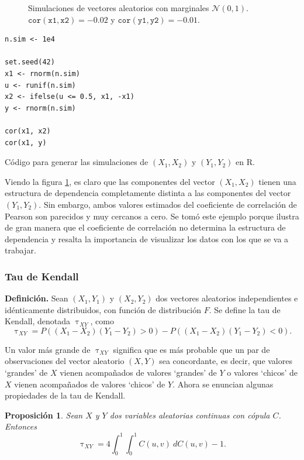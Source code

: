 \documentclass[11pt,a4paper]{article}
\newtheorem{proposition}{Proposición}[subsection]
\begin{document}
\begin{figure}[H]
    \caption{Simulaciones de vectores aleatorios con marginales $\mathcal{N}(0, 1)$. $\mathtt{cor(x1, x2)} = -0.02$ y $\mathtt{cor(y1, y2)} = -0.01$.}
    \label{fig:panel_corr}
\end{figure}

\begin{table}[htb]
\begin{lstlisting}
n.sim <- 1e4

set.seed(42)
x1 <- rnorm(n.sim)
u <- runif(n.sim)
x2 <- ifelse(u <= 0.5, x1, -x1)
y <- rnorm(n.sim)

cor(x1, x2)
cor(x1, y)
\end{lstlisting}
\caption{Código para generar las simulaciones de $(X_1, X_2)$ y $(Y_1, Y_2)$ en R.}
\label{cod:sim_ejemplo}
\end{table}

Viendo la figura \ref{fig:panel_corr}, es claro que las componentes del vector $(X_1, X_2)$ tienen una estructura de dependencia completamente distinta a las componentes del vector $(Y_1, Y_2)$. Sin embargo, ambos valores estimados del coeficiente de correlación de Pearson son parecidos y muy cercanos a cero. Se tomó este ejemplo porque ilustra de gran manera que el coeficiente de correlación no determina la estructura de dependencia y resalta la importancia de visualizar los datos con los que se va a trabajar.

\subsubsection*{Tau de Kendall}
\textbf{Definición.} Sean $(X_1, Y_1)$ y $(X_2, Y_2)$ dos vectores aleatorios independientes e idénticamente distribuidos, con función de distribución $F$. Se define la tau de Kendall, denotada $\uptau_{XY}$, como $$\uptau_{XY} = P\left((X_1-X_2)(Y_1-Y_2)>0\right) - P\left((X_1-X_2)(Y_1-Y_2)<0\right).$$

Un valor más grande de $\uptau_{XY}$ significa que es más probable que un par de observaciones del vector aleatorio $(X, Y)$ sea concordante, es decir, que valores `grandes' de $X$ vienen acompañados de valores `grandes' de $Y$ o valores `chicos' de $X$ vienen acompañados de valores `chicos' de $Y$. Ahora se enuncian algunas propiedades de la tau de Kendall.

\begin{proposition}
\label{prop:kendall}
Sean $X$ y $Y$ dos variables aleatorias continuas con cópula $C$. Entonces
$$\uptau_{XY} = 4\int_{0}^1\int_{0}^1C(u, v) \ dC(u, v) - 1.$$ 
\end{proposition}
\end{document}

